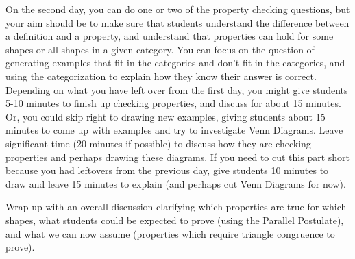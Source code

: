 \documentclass[noauthor, nooutcomes]{ximera}
\begin{document}
\begin{instructorNotes}
On the second day, you can do one or two of the property checking questions, but your aim should be to make sure that students understand the difference between a definition and a property, and understand that properties can hold for some shapes or all shapes in a given category. You can focus on the question of generating examples that fit in the categories and don't fit in the categories, and using the categorization to explain how they know their answer is correct. Depending on what you have left over from the first day, you might give students 5-10 minutes to finish up checking properties, and discuss for about 15 minutes. Or, you could skip right to drawing new examples, giving students about 15 minutes to come up with examples and try to investigate Venn Diagrams. Leave significant time (20 minutes if possible) to discuss how they are checking properties and perhaps drawing these diagrams. If you need to cut this part short because you had leftovers from the previous day, give students 10 minutes to draw and leave 15 minutes to explain (and perhaps cut Venn Diagrams for now).

Wrap up with an overall discussion clarifying which properties are true for which shapes, what students could be expected to prove (using the Parallel Postulate), and what we can now assume (properties which require triangle congruence to prove).

\end{instructorNotes}
\end{document}
